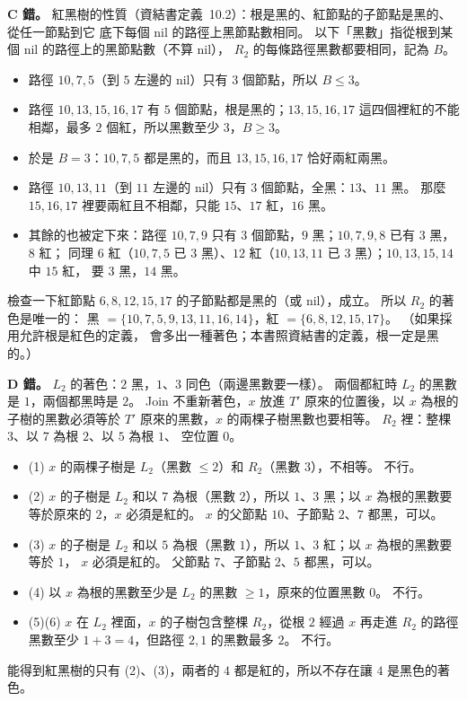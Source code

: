 \begin{pastsoln}
\textbf{C 錯。} 紅黑樹的性質（資結書定義~10.2）：根是黑的、紅節點的子節點是黑的、從任一節點到它
底下每個 nil 的路徑上黑節點數相同。 以下「黑數」指從根到某個 nil 的路徑上的黑節點數（不算 nil），
$R_2$ 的每條路徑黑數都要相同，記為 $B$。
\begin{itemize}
\item 路徑 $10, 7, 5$（到 $5$ 左邊的 nil）只有 $3$ 個節點，所以 $B \le 3$。
\item 路徑 $10, 13, 15, 16, 17$ 有 $5$ 個節點，根是黑的；$13, 15, 16, 17$ 這四個裡紅的不能相鄰，最多
$2$ 個紅，所以黑數至少 $3$，$B \ge 3$。
\item 於是 $B = 3$：$10, 7, 5$ 都是黑的，而且 $13, 15, 16, 17$ 恰好兩紅兩黑。
\item 路徑 $10, 13, 11$（到 $11$ 左邊的 nil）只有 $3$ 個節點，全黑：$13$、$11$ 黑。 那麼
$15, 16, 17$ 裡要兩紅且不相鄰，只能 $15$、$17$ 紅，$16$ 黑。
\item 其餘的也被定下來：路徑 $10, 7, 9$ 只有 $3$ 個節點，$9$ 黑；$10, 7, 9, 8$ 已有 $3$ 黑，$8$ 紅；
同理 $6$ 紅（$10, 7, 5$ 已 $3$ 黑）、$12$ 紅（$10, 13, 11$ 已 $3$ 黑）；$10, 13, 15, 14$ 中 $15$ 紅，
要 $3$ 黑，$14$ 黑。
\end{itemize}
檢查一下紅節點 $6, 8, 12, 15, 17$ 的子節點都是黑的（或 nil），成立。 所以 $R_2$ 的著色是唯一的：
黑 $= \{10, 7, 5, 9, 13, 11, 16, 14\}$，紅 $= \{6, 8, 12, 15, 17\}$。 （如果採用允許根是紅色的定義，
會多出一種著色；本書照資結書的定義，根一定是黑的。）

\textbf{D 錯。} $L_2$ 的著色：$2$ 黑，$1$、$3$ 同色（兩邊黑數要一樣）。 兩個都紅時 $L_2$ 的黑數是
$1$，兩個都黑時是 $2$。 Join 不重新著色，$x$ 放進 $T'$ 原來的位置後，以 $x$ 為根的子樹的黑數必須等於
$T'$ 原來的黑數，$x$ 的兩棵子樹黑數也要相等。 $R_2$ 裡：整棵 $3$、以 $7$ 為根 $2$、以 $5$ 為根 $1$、
空位置 $0$。
\begin{itemize}
\item (1) $x$ 的兩棵子樹是 $L_2$（黑數 $\le 2$）和 $R_2$（黑數 $3$），不相等。 不行。
\item (2) $x$ 的子樹是 $L_2$ 和以 $7$ 為根（黑數 $2$），所以 $1$、$3$ 黑；以 $x$ 為根的黑數要等於原來的
$2$，$x$ 必須是紅的。 $x$ 的父節點 $10$、子節點 $2$、$7$ 都黑，可以。
\item (3) $x$ 的子樹是 $L_2$ 和以 $5$ 為根（黑數 $1$），所以 $1$、$3$ 紅；以 $x$ 為根的黑數要等於 $1$，
$x$ 必須是紅的。 父節點 $7$、子節點 $2$、$5$ 都黑，可以。
\item (4) 以 $x$ 為根的黑數至少是 $L_2$ 的黑數 $\ge 1$，原來的位置黑數 $0$。 不行。
\item (5)(6) $x$ 在 $L_2$ 裡面，$x$ 的子樹包含整棵 $R_2$，從根 $2$ 經過 $x$ 再走進 $R_2$ 的路徑黑數至少
$1 + 3 = 4$，但路徑 $2, 1$ 的黑數最多 $2$。 不行。
\end{itemize}
能得到紅黑樹的只有 (2)、(3)，兩者的 $4$ 都是紅的，所以不存在讓 $4$ 是黑色的著色。


\end{pastsoln}
